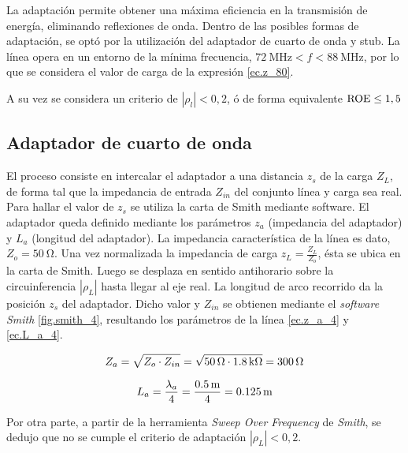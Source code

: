 La adaptación permite obtener una máxima eficiencia en la transmisión de energía, eliminando reflexiones de onda. Dentro de las posibles formas de adaptación, se optó por la utilización del adaptador de cuarto de onda y stub. La línea opera en un entorno de la mínima frecuencia, $\SI{72}{\mega\hertz} < f < \SI{88}{\mega\hertz}$, por lo que se considera el valor de carga de la expresión \eqref{ec.z_80}.

A su vez se considera un criterio de $|\rho_l|<0,2$, ó de forma equivalente $\rm{ROE} \leq 1,5$

\subsection{Adaptador de cuarto de onda}
El proceso consiste en intercalar el adaptador a una distancia $z_s$ de la carga $Z_L$, de forma tal que la impedancia de entrada $Z_{in}$ del conjunto línea y carga sea real. Para hallar el valor de $z_s$ se utiliza la carta de Smith mediante software. El adaptador queda definido mediante los parámetros $z_a$ (impedancia del adaptador) y $L_a$ (longitud del adaptador). La impedancia característica de la línea es dato, $Z_o = \SI{50}{\ohm}$. Una vez normalizada la impedancia de carga $z_L = \frac{Z_L}{Z_o}$, ésta se ubica en la carta de Smith. Luego se desplaza en sentido antihorario sobre la circuinferencia $|\rho_L|$ hasta llegar al eje real. La longitud de arco recorrido da la posición $z_s$ del adaptador. Dicho valor y $Z_{in}$ se obtienen mediante el \textit{software Smith} \ref{fig.smith_4}, resultando los parámetros de la línea \eqref{ec.z_a_4} y \eqref{ec.L_a_4}.

\begin{equation}
	\centering
	Z_a = \sqrt{Z_o \cdot Z_{in}} = \sqrt{ \SI{50}{\ohm} \cdot \SI{1.8}{\kilo\ohm} } = \SI{300}{\ohm}
	\label{ec.z_a_4}
\end{equation}	

\begin{equation}
	\centering
	L_a = \frac{\lambda_a}{4} = \frac{ \SI{0.5}{\meter} }{4} = \SI{0.125}{\meter}
	\label{ec.L_a_4}
\end{equation}



Por otra parte, a partir de la herramienta \textit{Sweep Over Frequency} de \textit{Smith}, se dedujo que no se cumple el criterio de adaptación $|\rho_L|< 0,2$.

